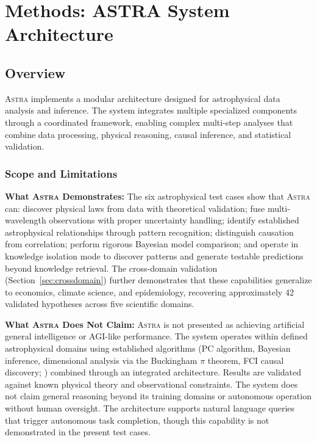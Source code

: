 \documentclass[usenatbib]{rasti}
\newcommand{\astra}{\textsc{Astra}\xspace}
\newcommand{\pc}{PC\xspace}
\newcommand{\fci}{FCI\xspace}
\begin{document}
\section{Methods: ASTRA System Architecture}
\label{sec:methods}

\subsection{Overview}
\label{sec:methods:overview}

\astra implements a modular architecture designed for astrophysical data analysis and inference.
The system integrates multiple specialized components through a coordinated framework, enabling complex multi-step analyses that combine data processing, physical reasoning, causal inference, and statistical validation.

\subsubsection{Scope and Limitations}
\label{sec:scope}

\textbf{What \astra Demonstrates:}
The six astrophysical test cases show that \astra can: discover physical laws from data with theoretical validation; fuse multi-wavelength observations with proper uncertainty handling; identify established astrophysical relationships through pattern recognition; distinguish causation from correlation; perform rigorous Bayesian model comparison; and operate in knowledge isolation mode to discover patterns and generate testable predictions beyond knowledge retrieval.
The cross-domain validation (Section~\ref{sec:crossdomain}) further demonstrates that these capabilities generalize to economics, climate science, and epidemiology, recovering approximately 42 validated hypotheses across five scientific domains.

\textbf{What \astra Does Not Claim:}
\astra is not presented as achieving artificial general intelligence or AGI-like performance.
The system operates within defined astrophysical domains using established algorithms (\pc algorithm, Bayesian inference, dimensional analysis via the Buckingham $\pi$ theorem, \fci causal discovery; \citealt{Zhang2008}) combined through an integrated architecture.
Results are validated against known physical theory and observational constraints.
The system does not claim general reasoning beyond its training domains or autonomous operation without human oversight.
The architecture supports natural language queries that trigger autonomous task completion, though this capability is not demonstrated in the present test cases.
\end{document}
